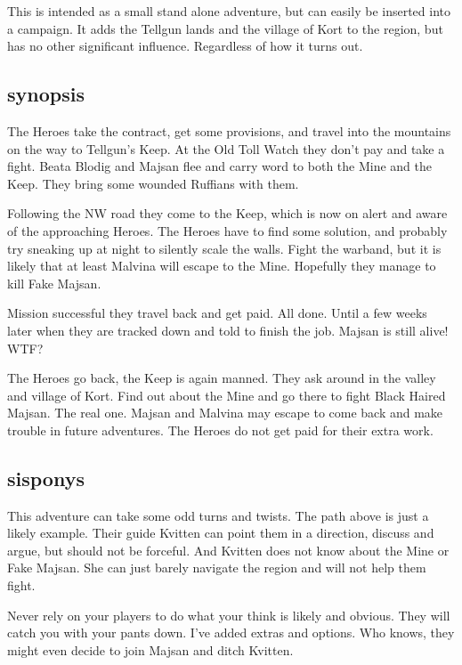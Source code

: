 \vspace{2.0\baselineskip}


\noindent
This is intended as a small stand alone adventure, but can easily be inserted into a campaign. It adds the Tellgun lands and the village of Kort to the region, but has no other significant influence. Regardless of how it turns out.


\subsection*{synopsis}
The Heroes take the contract, get some provisions, and travel into the mountains on the way to Tellgun's Keep. At the Old Toll Watch they don't pay and take a fight. Beata Blodig and Majsan flee and carry word to both the Mine and the Keep. They bring some wounded Ruffians with them.

Following the NW road they come to the Keep, which is now on alert and aware of the approaching Heroes. The Heroes have to find some solution, and probably try sneaking up at night to silently scale the walls. Fight the warband, but it is likely that at least Malvina will escape to the Mine. Hopefully they manage to kill Fake Majsan.

Mission successful they travel back and get paid. All done. Until a few weeks later when they are tracked down and told to finish the job. Majsan is still alive! WTF?

The Heroes go back, the Keep is again manned. They ask around in the valley and village of Kort. Find out about the Mine and go there to fight Black Haired Majsan. The real one. Majsan and Malvina may escape to come back and make trouble in future adventures. The Heroes do not get paid for their extra work.


\subsection*{sisponys}
This adventure can take some odd turns and twists. The path above is just a likely example. Their guide Kvitten can point them in a direction, discuss and argue, but should not be forceful. And Kvitten does not know about the Mine or Fake Majsan. She can just barely navigate the region and will not help them fight.

Never rely on your players to do what your think is likely and obvious. They will catch you with your pants down. I've added extras and options. Who knows, they might even decide to join Majsan and ditch Kvitten.


